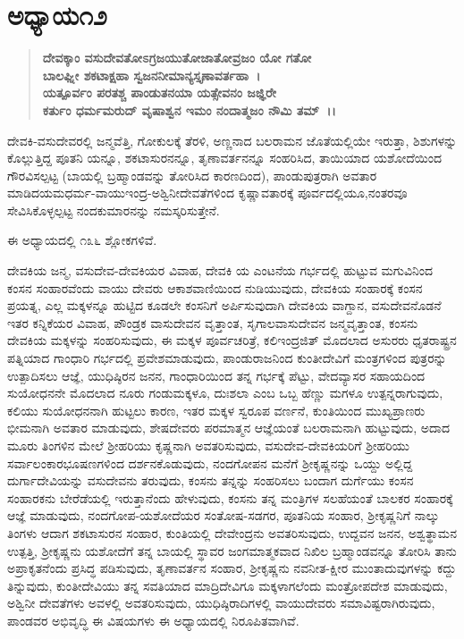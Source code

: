 \section*{ಅಧ್ಯಾಯ\enginline{-}೧೨}

\begin{verse}
\textbf{ದೇವಕ್ಕಾಂ ವಸುದೇವತೋಽಗ್ರಜಯುತೋಜಾತೋವ್ರಜಂ ಯೋ ಗತೋ}\\\textbf{ಬಾಲಘ್ನೀ ಶಕಟಾಕ್ಷಹಾ ಸ್ವಜನನೀಮಾನ್ಯಸ್ತೃಣಾವರ್ತಹಾ~।}\\\textbf{ಯತ್ಪೂರ್ವಂ ಪರತಶ್ಚ ಪಾಂಡುತನಯಾ ಯತ್ಸೇವನಂ ಜಜ್ಞಿರೇ}\\\textbf{ಕರ್ತುಂ ಧರ್ಮಮರುದ್ ವೃಷಾಶ್ವನ ಇಮಂ ನಂದಾತ್ಮಜಂ ನೌಮಿ ತಮ್~।।}
\end{verse}

ದೇವಕಿ-ವಸುದೇವರಲ್ಲಿ ಜನ್ಮವೆತ್ತಿ, ಗೋಕುಲಕ್ಕೆ ತೆರಳಿ, ಅಣ್ಣನಾದ ಬಲರಾಮನ ಜೊತೆಯಲ್ಲಿಯೇ ಇರುತ್ತಾ, ಶಿಶುಗಳನ್ನು ಕೊಲ್ಲುತ್ತಿದ್ದ ಪೂತನಿ ಯನ್ನೂ, ಶಕಟಾಸುರನನ್ನೂ, ತೃಣಾವರ್ತನನ್ನೂ ಸಂಹರಿಸಿದ, ತಾಯಿಯಾದ ಯಶೋದೆಯಿಂದ ಗೌರವಿಸಲ್ಪಟ್ಟ (ಬಾಯಲ್ಲಿ ಬ್ರಹ್ಮಾಂಡವನ್ನು ತೋರಿಸಿದ ಕಾರಣದಿಂದ), ಪಾಂಡುಪುತ್ರರಾಗಿ ಅವತಾರ ಮಾಡಿದ\break ಯಮಧರ್ಮ-ವಾಯುಇಂದ್ರ-ಅಶ್ವಿನೀದೇವತೆಗಳಿಂದ ಕೃಷ್ಣಾವತಾರಕ್ಕೆ ಪೂರ್ವದಲ್ಲಿಯೂ,\break ನಂತರವೂ ಸೇವಿಸಿಕೊಳ್ಳಲ್ಪಟ್ಟ ನಂದಕುಮಾರನನ್ನು ನಮಸ್ಕರಿಸುತ್ತೇನೆ.

ಈ ಅಧ್ಯಾಯದಲ್ಲಿ ೧೩೬ ಶ್ಲೋಕಗಳಿವೆ.

ದೇವಕಿಯ ಜನ್ಮ, ವಸುದೇವ-ದೇವಕಿಯರ ವಿವಾಹ, ದೇವಕಿ ಯ ಎಂಟನೆಯ ಗರ್ಭದಲ್ಲಿ ಹುಟ್ಟುವ ಮಗುವಿನಿಂದ ಕಂಸನ ಸಂಹಾರವೆಂದು ವಾಯು ದೇವರು ಆಕಾಶವಾಣಿಯಿಂದ ನುಡಿಯುವುದು, ದೇವಕಿಯ ಸಂಹಾರಕ್ಕೆ ಕಂಸನ ಪ್ರಯತ್ನ, ಎಲ್ಲ ಮಕ್ಕಳನ್ನೂ ಹುಟ್ಟಿದ ಕೂಡಲೇ ಕಂಸನಿಗೆ ಅರ್ಪಿಸುವುದಾಗಿ ದೇವಕಿಯ ವಾಗ್ದಾನ, ವಸುದೇವನೊಡನೆ ಇತರ ಕನ್ನಿಕೆಯರ ವಿವಾಹ, ಪೌಂಡ್ರಕ ವಾಸುದೇವನ ವೃತ್ತಾಂತ, ಸೃಗಾಲವಾಸುದೇವನ ಜನ್ಮವೃತ್ತಾಂತ, ಕಂಸನು ದೇವಕಿಯ ಮಕ್ಕಳನ್ನು ಸಂಹರಿಸುವುದು, ಈ ಮಕ್ಕಳ ಪೂರ್ವಚರಿತ್ರೆ, ಕಲಿಇಂದ್ರಜಿತ್ ಮೊದಲಾದ ಅಸುರರು ಧೃತರಾಷ್ಟ್ರನ ಪತ್ನಿಯಾದ ಗಾಂಧಾರಿ ಗರ್ಭದಲ್ಲಿ ಪ್ರವೇಶಮಾಡುವುದು, ಪಾಂಡುರಾಜನಿಂದ ಕುಂತೀದೇವಿಗೆ ಮಂತ್ರಗಳಿಂದ ಪುತ್ರರನ್ನು ಉತ್ಪಾದಿಸಲು ಆಜ್ಞೆ, ಯುಧಿಷ್ಠಿರನ ಜನನ, ಗಾಂಧಾರಿಯಿಂದ ತನ್ನ ಗರ್ಭಕ್ಕೆ ಪೆಟ್ಟು, ವೇದವ್ಯಾಸರ ಸಹಾಯದಿಂದ ಸುಯೋಧನನೇ ಮೊದಲಾದ ನೂರು ಗಂಡುಮಕ್ಕಳೂ, ದುಃಶಲಾ ಎಂಬ ಒಬ್ಬ ಹೆಣ್ಣು ಮಗಳೂ ಉತ್ಪನ್ನರಾಗುವುದು, ಕಲಿಯು ಸುಯೋಧನನಾಗಿ ಹುಟ್ಟಲು ಕಾರಣ, ಇತರ ಮಕ್ಕಳ ಸ್ವರೂಪ ವರ್ಣನೆ, ಕುಂತಿಯಿಂದ ಮುಖ್ಯಪ್ರಾಣರು ಭೀಮನಾಗಿ ಅವತಾರ ಮಾಡುವುದು, ಶೇಷದೇವರು ಪರಮಾತ್ಮನ ಆಜ್ಞೆಯಂತೆ ಬಲರಾಮನಾಗಿ ಹುಟ್ಟುವುದು, ಅದಾದ ಮೂರು ತಿಂಗಳಿನ ಮೇಲೆ ಶ‍್ರೀಹರಿಯು ಕೃಷ್ಣನಾಗಿ ಅವತರಿಸುವುದು, ವಸುದೇವ-ದೇವಕಿ\-ಯರಿಗೆ ಶ‍್ರೀಹರಿಯು ಸರ್ವಾಲಂಕಾರಭೂಷಣಗಳಿಂದ ದರ್ಶನಕೊಡುವುದು, ನಂದಗೋಪನ ಮನೆಗೆ ಶ‍್ರೀಕೃಷ್ಣನನ್ನು ಒಯ್ದು ಅಲ್ಲಿದ್ದ ದುರ್ಗಾದೇವಿಯನ್ನು ವಸುದೇವನು ತರುವುದು, ಕಂಸನು ತನ್ನನ್ನು ಸಂಹರಿಸಲು ಬಂದಾಗ ದುರ್ಗೆಯು ಕಂಸನ ಸಂಹಾರಕನು ಬೇರೆಡೆಯಲ್ಲಿ ಇರುತ್ತಾನೆಂದು ಹೇಳುವುದು, ಕಂಸನು ತನ್ನ ಮಂತ್ರಿಗಳ ಸಲಹೆಯಂತೆ ಬಾಲಕರ ಸಂಹಾರಕ್ಕೆ ಆಜ್ಞೆ ಮಾಡುವುದು, ನಂದಗೋಪ-ಯಶೋದೆಯರ ಸಂತೋಷ-ಸಡಗರ, ಪೂತನಿಯ ಸಂಹಾರ, ಶ‍್ರೀಕೃಷ್ಣನಿಗೆ ನಾಲ್ಕು ತಿಂಗಳು ಆದಾಗ ಶಕಟಾಸುರನ ಸಂಹಾರ, ಕುಂತಿಯಲ್ಲಿ ದೇವೇಂದ್ರನು ಅವತರಿಸುವುದು, ಉದ್ದವನ ಜನನ, ಅಶ್ವತ್ಥಾಮನ ಉತ್ಪತ್ತಿ, ಶ‍್ರೀಕೃಷ್ಣನು ಯಶೋದೆಗೆ ತನ್ನ ಬಾಯಲ್ಲಿ ಸ್ಥಾವರ ಜಂಗಮಾತ್ಮಕವಾದ ನಿಖಿಲ ಬ್ರಹ್ಮಾಂಡವನ್ನೂ ತೋರಿಸಿ ತಾನು ಅಪ್ರಾಕೃತನೆಂದು ಪ್ರಸಿದ್ಧ ಪಡಿಸುವುದು, ತೃಣಾವರ್ತನ ಸಂಹಾರ, ಶ‍್ರೀಕೃಷ್ಣನು ನವನೀತ-ಕ್ಷೀರ ಮುಂತಾದುವುಗಳನ್ನು ಕದ್ದು ತಿನ್ನುವುದು, ಕುಂತೀದೇವಿಯು ತನ್ನ ಸವತಿಯಾದ ಮಾದ್ರಿದೇವಿಗೂ ಮಕ್ಕಳಾಗಲೆಂದು ಮಂತ್ರೋಪದೇಶ ಮಾಡುವುದು, ಅಶ್ವಿನೀ ದೇವತೆಗಳು ಅವಳಲ್ಲಿ ಅವತರಿಸುವುದು, ಯುಧಿಷ್ಠಿರಾದಿಗಳಲ್ಲಿ ವಾಯುದೇವರು ಸಮಾವಿಷ್ಟರಾಗಿರುವುದು, ಪಾಂಡವರ ಅಭಿವೃದ್ಧಿ ಈ ವಿಷಯಗಳು ಈ ಅಧ್ಯಾಯದಲ್ಲಿ ನಿರೂಪಿತವಾಗಿವೆ.


